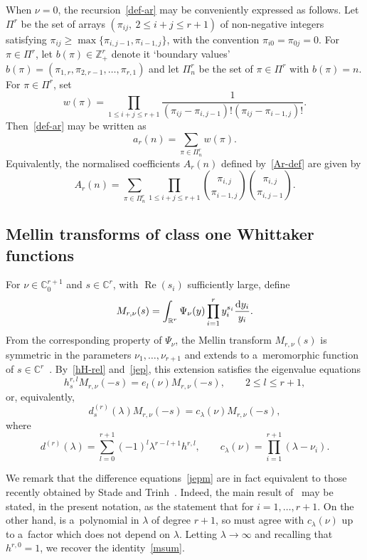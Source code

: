 \documentclass[pdftex]{sigma}
\theoremstyle{definition}
\newcommand{\C}{{\mathbb C}}
\newcommand\R{{\mathbb R}}
\newcommand\Z{{\mathbb Z}}
\begin{document}
When $\nu=0$, the recursion~\eqref{def-ar} may be conveniently expressed as follows.
Let $\Pi^r$ be the set of arrays $(\pi_{ij},\ 2\le i+j\le r+1)$ of non-negative integers
satisfying $ \pi_{ij} \ge \max\{\pi_{i,j-1},\pi_{i-1,j}\}$,
with the convention $\pi_{i0}=\pi_{0j}=0$. For $\pi\in\Pi^r$, let $b(\pi)\in\Z_+^r$
denote it `boundary values' $b(\pi)=(\pi_{1,r},\pi_{2,r-1},\dots,\pi_{r,1})$ and
let $\Pi^r_n$ be the set of $\pi\in\Pi^r$ with $b(\pi)=n$. For $\pi\in\Pi^r$, set
\[ w(\pi)=\prod_{1\le i+j \le r+1} \frac1{(\pi_{ij}-\pi_{i,j-1})! (\pi_{ij}-\pi_{i-1,j})!}.\]
Then~\eqref{def-ar} may be written as
\[ a_r(n) = \sum_{\pi\in\Pi^r_n} w(\pi). \]
Equivalently, the normalised coefficients $A_r(n)$ defined by~\eqref{Ar-def}
are given by
\begin{equation}\label{Ar-bs} A_r(n) = \sum_{\pi\in\Pi^r_n} \prod_{1\le i+j \le r+1} \binom{\pi_{i,j}}{\pi_{i-1,j}} \binom{\pi_{i,j}}{\pi_{i,j-1}}. \end{equation}

\subsection{Mellin transforms of class one Whittaker functions}\label{mellin}

For $\nu\in\C_0^{r+1}$ and $s\in\C^r$, with $\operatorname{Re}(s_i)$ sufficiently large, define
\[
M_{r,\nu}(s)=\int_{\R^r} \Psi_\nu(y) \prod_{i=1}^r y_i^{s_i} \frac{{\rm d}y_i}{y_i}.
\]
From the corresponding property of $\Psi_\nu$,
the Mellin transform $M_{r,\nu}(s)$ is symmetric in the parameters $\nu_1,\dots,\nu_{r+1}$
and extends to a~meromorphic function of $s\in\C^r$~\cite{fg}.
By~\eqref{hH-rel} and~\eqref{jep}, this extension satisfies the eigenvalue equations
\begin{equation}\label{jepm} h_s^{r,l} M_{r,\nu}(-s) = e_l(\nu) M_{r,\nu}(-s),\qquad 2\le l\le r+1,\end{equation}
or, equivalently,
\begin{equation}\label{msum}
d_s^{(r)}(\lambda) M_{r,\nu}(-s) = c_\lambda(\nu) M_{r,\nu}(-s),
\end{equation}
where
\[
d^{(r)}(\lambda) = \sum_{l=0}^{r+1} (-1)^l \lambda^{r-l+1} h^{r,l},\qquad c_\lambda(\nu)
=\prod_{i=1}^{r+1} (\lambda-\nu_i).
\]

We remark that the difference equations~\eqref{jepm} are in fact equivalent to those
recently obtained by Stade and Trinh~\cite{st}. Indeed, the main result
of~\cite{st} may be stated, in the present notation, as the statement that
 for $i=1,\dots,r+1$. On the other hand,
 is a~polynomial in $\lambda$ of degree $r+1$, so
must agree with $c_\lambda(\nu)$ up to a~factor which does not depend on $\lambda$.
Letting $\lambda\to\infty$ and recalling that $h^{r,0}=1$, we recover the identity~\eqref{msum}.
\end{document}
